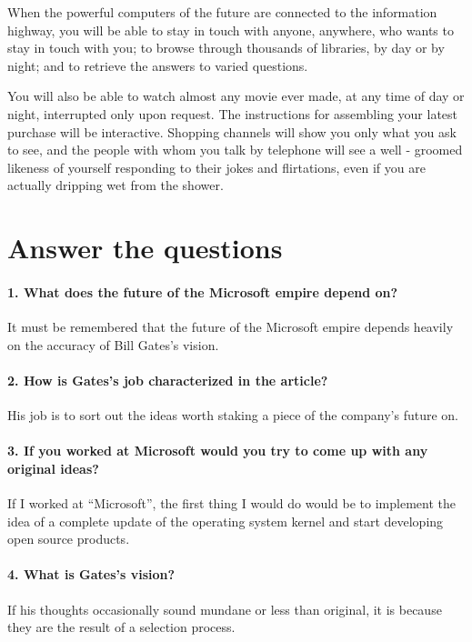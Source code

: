 When the powerful computers of the future are connected to the information highway, you will be able to stay in touch with anyone, anywhere, who wants to stay in touch with you; to browse through thousands of libraries, by day or by night; and to retrieve the answers to varied questions.


You will also be able to watch almost any movie ever made, at any time of day or night, interrupted only upon request. The instructions for assembling your latest purchase will be interactive. Shopping channels will show you only what you ask to see, and the people with whom you talk by telephone will see a well - groomed likeness of yourself responding to their jokes and flirtations, even if you are actually dripping wet from the shower.

\section{Answer the questions}
    \paragraph{1. What does the future of the Microsoft empire depend on?}
    It must be remembered that the future of the Microsoft empire depends heavily on the accuracy of Bill Gates's vision.
    
    \paragraph{2. How is Gates's job characterized in the article?}
    His job is to sort out the ideas worth staking a piece of the company's future on.
    
    \paragraph{3. If you worked at Microsoft would you try to come up with any original ideas?}
    If I worked at ``Microsoft'', the first thing I would do would be to implement the idea of a complete update of the operating system kernel and start developing open source products.
    
    \paragraph{4. What is Gates's vision?}
    If his thoughts occasionally sound mundane or less than original, it is because they are the result of a selection process.
    
